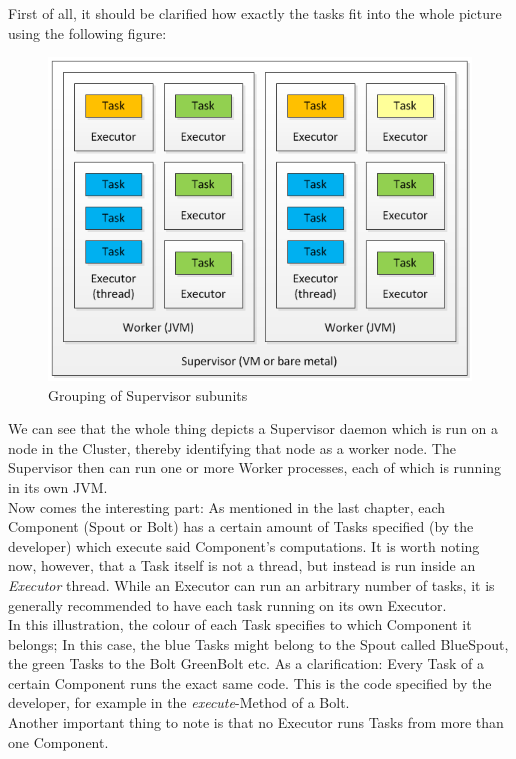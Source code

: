 \documentclass[12pt,a4paper]{article}
\begin{document}
First of all, it should be clarified how exactly the tasks fit into the whole picture using the following figure:\\
\begin{figure}[H]
\begin{center}
\includegraphics[scale=0.7]{images/Storm-Supervisors-Workers-Executors-Tasks.png}
\end{center}
\caption{Grouping of Supervisor subunits}
\end{figure}
We can see that the whole thing depicts a Supervisor daemon which is run on a node in the Cluster, thereby identifying that node as a worker node. The Supervisor then can run one or more Worker processes, each of which is running in its own JVM.\\
\indent Now comes the interesting part: As mentioned in the last chapter, each Component (Spout or Bolt) has a certain amount of Tasks specified (by the developer) which execute said Component's computations. It is worth noting now, however, that a Task itself is not a thread, but instead is run inside an \textit{Executor} thread. While an Executor can run an arbitrary number of tasks, it is generally recommended to have each task running on its own Executor.\\
\indent In this illustration, the colour of each Task specifies to which Component it belongs; In this case, the blue Tasks might belong to the Spout called BlueSpout, the green Tasks to the Bolt GreenBolt etc. As a clarification: Every Task of a certain Component runs the exact same code. This is the code specified by the developer, for example in the \textit{execute}-Method of a Bolt.\\
\indent Another important thing to note is that no Executor runs Tasks from more than one Component.
\end{document}
